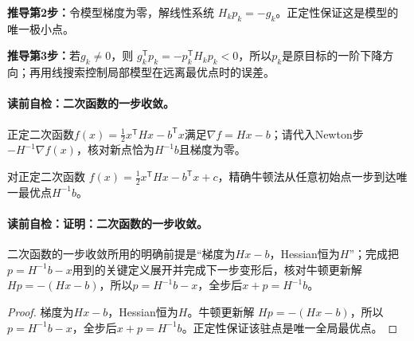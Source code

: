 \textbf{推导第2步：}令模型梯度为零，解线性系统 $H_kp_k=-g_k$。正定性保证这是模型的唯一极小点。

\textbf{推导第3步：}若$g_k\ne0$，则 $g_k^{\mathsf T}p_k=-p_k^{\mathsf T}H_kp_k<0$，所以$p_k$是原目标的一阶下降方向；再用线搜索控制局部模型在远离最优点时的误差。

\label{struct:V1-C08-CH14}
\paragraph{读前自检：二次函数的一步收敛。}正定二次函数$f(x)=\tfrac12x^{\mathsf T}Hx-b^{\mathsf T}x$满足$\nabla f=Hx-b$；请代入Newton步$-H^{-1}\nabla f(x)$，核对新点恰为$H^{-1}b$且梯度为零。\par

\begin{corollary}[二次函数的一步收敛]
对正定二次函数 $f(x)=\tfrac12x^{\mathsf T}Hx-b^{\mathsf T}x+c$，精确牛顿法从任意初始点一步到达唯一最优点$H^{-1}b$。
\end{corollary}
\paragraph{读前自检：证明：二次函数的一步收敛。}二次函数的一步收敛所用的明确前提是“梯度为$Hx-b$，Hessian恒为$H$”；完成把$p=H^{-1}b-x$用到的关键定义展开并完成下一步变形后，核对牛顿更新解 $Hp=-(Hx-b)$，所以$p=H^{-1}b-x$，全步后$x+p=H^{-1}b$。\par

\begin{proof}
梯度为$Hx-b$，Hessian恒为$H$。牛顿更新解 $Hp=-(Hx-b)$，所以$p=H^{-1}b-x$，全步后$x+p=H^{-1}b$。正定性保证该驻点是唯一全局最优点。
\end{proof}

